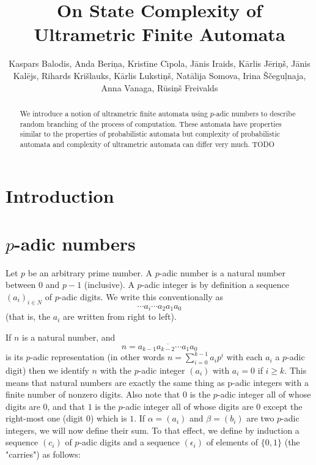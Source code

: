 \documentclass{llncs}
\begin{document}
\title{On State Complexity of Ultrametric Finite Automata}


\author{
Kaspars Balodis,
Anda Beri\c na,
Krist\= \i ne C\= \i pola,
J\= anis Iraids,
K\= arlis J\= eri\c n\v s,
J\= anis Kal\= ejs,
Rihards Kri\v slauks,
K\= arlis Luksti\c n\v s,
Nat\= alija Somova,
Irina \v S\v cegu\c lnaja,
Anna Vanaga,
R\= usi\c n\v s Freivalds}



\maketitle

\begin{abstract}  
We introduce a notion of ultrametric finite automata using $p$-adic numbers to describe random branching of the process of computation. These automata have properties similar to the properties of probabilistic automata but complexity of probabilistic automata and complexity of ultrametric automata can differ very much.
TODO
\end{abstract} 



\section{Introduction} 

\section{$p$-adic numbers}

Let $p$ be an arbitrary prime number. A $p$-adic number is a natural number between $0$ and $p-1$ (inclusive). A $p$-adic integer is by definition a sequence $(a_i)_{i \in N}$ of $p$-adic digits. We write this conventionally as
$$
\cdots a_i \cdots  a_2 a_1 a_0
$$
(that is, the $a_i$ are written from right to left).

If $n$ is a natural number, and
$$
n = \overline{a_{k-1} a_{k-2} \cdots  a_1 a_0}
$$
is its $p$-adic representation (in other words $n = \sum ^{k-1}_{i=0}  a_ip^i$ with each $a_i$ a $p$-adic digit) then we identify $n$ with the $p$-adic integer $(a_i)$ with $a_i = 0$ if $i \geq k$. This means that natural numbers are exactly the same thing as p-adic integers with a finite number of nonzero digits. Also note that $0$ is the $p$-adic integer all of whose digits are $0$, and that $1$ is the $p$-adic integer all of whose digits are $0$ except the right-most one (digit $0$) which is $1$.
If $\alpha  = (a_i)$ and $\beta = (b_i)$ are two $p$-adic integers, we will now define their sum. To that effect, we define by induction a sequence $(c_i)$ of $p$-adic digits and a sequence $(\epsilon _i)$ of elements of $\{0, 1\}$ (the "carries") as follows:
\end{document}
